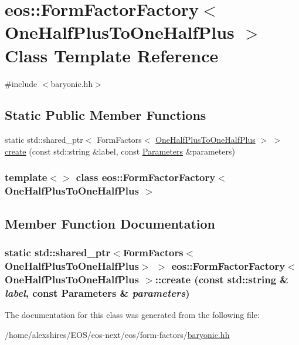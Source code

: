 \hypertarget{classeos_1_1FormFactorFactory_3_01OneHalfPlusToOneHalfPlus_01_4}{
\section{eos::FormFactorFactory$<$ OneHalfPlusToOneHalfPlus $>$ Class Template Reference}
\label{classeos_1_1FormFactorFactory_3_01OneHalfPlusToOneHalfPlus_01_4}
}


{\ttfamily \#include $<$baryonic.hh$>$}\subsection*{Static Public Member Functions}
\begin{DoxyCompactItemize}
\item 
static std::shared\_\-ptr$<$ FormFactors$<$ \hyperlink{structeos_1_1OneHalfPlusToOneHalfPlus}{OneHalfPlusToOneHalfPlus} $>$ $>$ \hyperlink{classeos_1_1FormFactorFactory_3_01OneHalfPlusToOneHalfPlus_01_4_a8bad675ee9c637814ff50f69bec3447a}{create} (const std::string \&label, const \hyperlink{classeos_1_1Parameters}{Parameters} \&parameters)
\end{DoxyCompactItemize}
\subsubsection*{template$<$$>$ class eos::FormFactorFactory$<$ OneHalfPlusToOneHalfPlus $>$}



\subsection{Member Function Documentation}
\hypertarget{classeos_1_1FormFactorFactory_3_01OneHalfPlusToOneHalfPlus_01_4_a8bad675ee9c637814ff50f69bec3447a}{
\subsubsection[{create}]{\setlength{\rightskip}{0pt plus 5cm}static std::shared\_\-ptr$<$FormFactors$<${\bf OneHalfPlusToOneHalfPlus}$>$ $>$ eos::FormFactorFactory$<$ {\bf OneHalfPlusToOneHalfPlus} $>$::create (const std::string \& {\em label}, \/  const {\bf Parameters} \& {\em parameters})}}
\label{classeos_1_1FormFactorFactory_3_01OneHalfPlusToOneHalfPlus_01_4_a8bad675ee9c637814ff50f69bec3447a}


The documentation for this class was generated from the following file:\begin{DoxyCompactItemize}
\item 
/home/alexshires/EOS/eos-\/next/eos/form-\/factors/\hyperlink{baryonic_8hh}{baryonic.hh}\end{DoxyCompactItemize}
